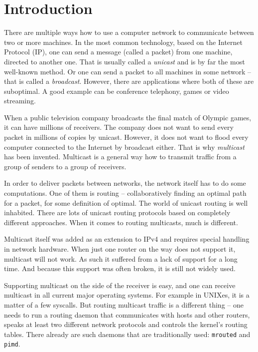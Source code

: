 \chapter*{Introduction}


There are multiple ways how to use a computer network to communicate between two
or more machines. In the most common technology, based on the Internet Protocol
(IP), one can send a message (called a packet) from one machine, directed to
another one. That is usually called a \emph{unicast} and is by far the most well-known
method. Or one can send a packet to all machines in some network -- that is
called a \emph{broadcast}. However, there are applications where both of these
are suboptimal. A good example can be conference telephony, games or video
streaming.

When a public television company broadcasts the final match of Olympic games, it can
have millions of receivers. The company does not want to send every packet in
millions of copies by unicast. However, it does not want to flood every
computer connected to the Internet by broadcast either. That is why \emph{multicast} has
been invented. Multicast is a general way how to transmit traffic from a group of
senders to a group of receivers.

In order to deliver packets between networks, the network itself has to do some
computations. One of them is routing -- collaboratively finding an optimal path
for a packet, for some definition of optimal.
The world of unicast routing is well inhabited. There are lots of unicast routing
protocols based on completely different approaches. When it comes to routing
multicasts, much is different.

Multicast itself was added as an extension to IPv4 and requires special
handling in network hardware. When just one router on the way does not support
it, multicast will not work. As such it suffered from a lack of support for a long
time. And because this support was often broken, it is still not widely used.

Supporting multicast on the side of the receiver is easy, and one can receive
multicast in all current major operating systems. For example in UNIXes, it is
a matter of a few syscalls. But routing multicast traffic is a different thing
-- one needs to run a routing daemon that communicates with hosts and other
routers, speaks at least two different network protocols and controls the
kernel's routing tables. There already are such daemons that are traditionally
used: \texttt{mrouted} and \texttt{pimd}.

